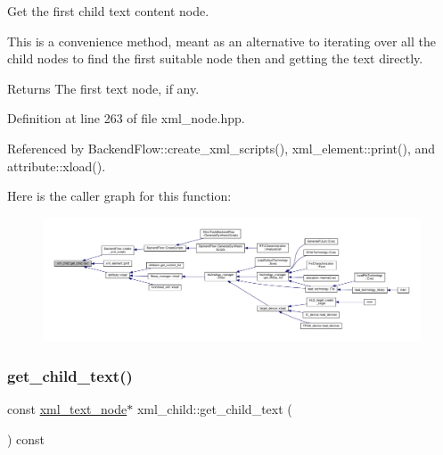 Get the first child text content node. 

This is a convenience method, meant as an alternative to iterating over all the child nodes to find the first suitable node then and getting the text directly. \begin{DoxyReturn}{Returns}
The first text node, if any. 
\end{DoxyReturn}


Definition at line 263 of file xml\+\_\+node.\+hpp.



Referenced by Backend\+Flow\+::create\+\_\+xml\+\_\+scripts(), xml\+\_\+element\+::print(), and attribute\+::xload().

Here is the caller graph for this function\+:
\nopagebreak
\begin{figure}[H]
\begin{center}
\leavevmode
\includegraphics[width=350pt]{d7/df9/classxml__child_aad2e6a11fcbe5e07fe1269444c9ab0ea_icgraph}
\end{center}
\end{figure}
\mbox{\label{classxml__child_ac5dfa7787308680d0ec0639fd69c3b44}} 
\subsubsection{\texorpdfstring{get\+\_\+child\+\_\+text()}{get\_child\_text()}\hspace{0.1cm}{\footnotesize\ttfamily [2/2]}}
{\footnotesize\ttfamily const \hyperlink{classxml__text__node}{xml\+\_\+text\+\_\+node}$\ast$ xml\+\_\+child\+::get\+\_\+child\+\_\+text (\begin{DoxyParamCaption}{ }\end{DoxyParamCaption}) const\hspace{0.3cm}{\ttfamily [inline]}}



